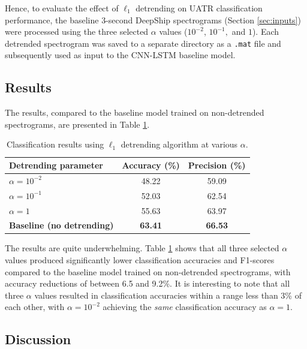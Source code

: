 Hence, to evaluate the effect of $\ell_1$ detrending on UATR classification performance, the baseline 3-second DeepShip spectrograms (Section \ref{sec:inputs}) were processed using the three selected $\alpha$ values ($10^{-2}$, $10^{-1},$ and $1$). Each detrended spectrogram was saved to a separate directory as a \texttt{.mat} file and subsequently used as input to the CNN-LSTM baseline model. 

\subsection{Results}

The results, compared to the baseline model trained on non-detrended spectrograms, are presented in Table \ref{tab:detrend-results-3s}.

\begin{table}[htbp]
    \centering
    \caption{Classification results using $\ell_1$ detrending algorithm at various $\alpha$.}
    \label{tab:detrend-results-3s}
    \begin{tabular}{lcc}
        \toprule
        \textbf{Detrending parameter} & \textbf{Accuracy (\%)} & \textbf{Precision (\%)} \\ \midrule
        $\alpha = 10^{-2}$            & 48.22 & 59.09 \\
        $\alpha = 10^{-1}$            & 52.03 & 62.54 \\
        $\alpha = 1$                  & 55.63 & 63.97 \\
        \textbf{Baseline (no detrending)}  & \textbf{63.41} & \textbf{66.53} \\
        \bottomrule
    \end{tabular}
\end{table}


The results are quite underwhelming. Table \ref{tab:detrend-results-3s} shows that all three selected $\alpha$ values produced significantly lower classification accuracies and F1-scores compared to the baseline model trained on non-detrended spectrograms, with accuracy reductions of between 6.5 and 9.2\%. It is interesting to note that all three $\alpha$ values resulted in classification accuracies within a range less than 3\% of each other, with $\alpha = 10^{-2}$ achieving the \textit{same} classification accuracy as $\alpha = 1$. 

\subsection{Discussion}


